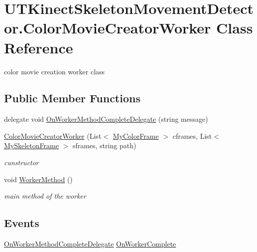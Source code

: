 \hypertarget{class_u_t_kinect_skeleton_movement_detector_1_1_color_movie_creator_worker}{\section{U\-T\-Kinect\-Skeleton\-Movement\-Detector.\-Color\-Movie\-Creator\-Worker Class Reference}
\label{class_u_t_kinect_skeleton_movement_detector_1_1_color_movie_creator_worker}
}


color movie creation worker class  


\subsection*{Public Member Functions}
\begin{DoxyCompactItemize}
\item 
delegate void \hyperlink{class_u_t_kinect_skeleton_movement_detector_1_1_color_movie_creator_worker_a5bb43499cb3485ff2cc4a139b5f77050}{On\-Worker\-Method\-Complete\-Delegate} (string message)
\item 
\hyperlink{class_u_t_kinect_skeleton_movement_detector_1_1_color_movie_creator_worker_a6fa202da9a18d6af550a497cc42378fe}{Color\-Movie\-Creator\-Worker} (List$<$ \hyperlink{class_u_t_kinect_skeleton_movement_detector_1_1_my_color_frame}{My\-Color\-Frame} $>$ cframes, List$<$ \hyperlink{class_u_t_kinect_skeleton_movement_detector_1_1_my_skeleton_frame}{My\-Skeleton\-Frame} $>$ sframes, string path)
\begin{DoxyCompactList}\small\item\em cunstructor \end{DoxyCompactList}\item 
void \hyperlink{class_u_t_kinect_skeleton_movement_detector_1_1_color_movie_creator_worker_aff3022fbab201ec116d79bdb0a1e6d21}{Worker\-Method} ()
\begin{DoxyCompactList}\small\item\em main method of the worker \end{DoxyCompactList}\end{DoxyCompactItemize}
\subsection*{Events}
\begin{DoxyCompactItemize}
\item 
\hyperlink{class_u_t_kinect_skeleton_movement_detector_1_1_color_movie_creator_worker_a5bb43499cb3485ff2cc4a139b5f77050}{On\-Worker\-Method\-Complete\-Delegate} \hyperlink{class_u_t_kinect_skeleton_movement_detector_1_1_color_movie_creator_worker_aa3e3f57176cf63366e90893f7095aa83}{On\-Worker\-Complete}
\end{DoxyCompactItemize}


